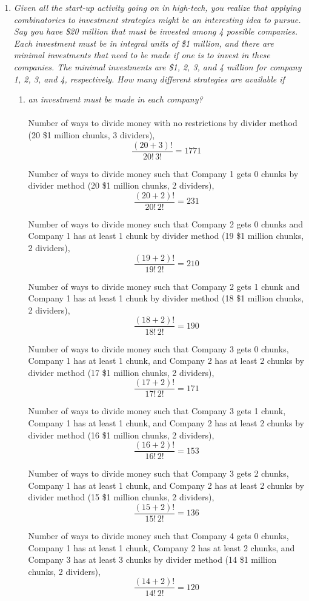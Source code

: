 \documentclass{article} %
\begin{document}
\begin{enumerate}
	\item \textit{Given all the start-up activity going on in high-tech, you realize that applying combinatorics to investment strategies might be an interesting idea to pursue. Say you have \$20 million that must be invested among 4 possible companies. Each investment must be in integral units of \$1 million, and there are minimal investments that need to be made if one is to invest in these companies. The minimal investments are \$1, 2, 3, and 4 million for company 1, 2, 3, and 4, respectively. How many different strategies are available if}
	\begin{enumerate}
		\item \textit{an investment must be made in each company?}\\
		\\
		Number of ways to divide money with no restrictions by divider method (20 \$1 million chunks, 3 dividers), $$\frac{(20 + 3)!}{20!\,3!} = 1771$$
		
		Number of ways to divide money such that Company 1 gets 0 chunks by divider method (20 \$1 million chunks, 2 dividers), $$\frac{(20 + 2)!}{20!\,2!} = 231$$
		
		Number of ways to divide money such that Company 2 gets 0 chunks and Company 1 has at least 1 chunk by divider method (19 \$1 million chunks, 2 dividers), $$\frac{(19 + 2)!}{19!\,2!} = 210$$
		
		Number of ways to divide money such that Company 2 gets 1 chunk and Company 1 has at least 1 chunk by divider method (18 \$1 million chunks, 2 dividers), $$\frac{(18 + 2)!}{18!\,2!} = 190$$
		
		Number of ways to divide money such that Company 3 gets 0 chunks, Company 1 has at least 1 chunk, and Company 2 has at least 2 chunks by divider method (17 \$1 million chunks, 2 dividers), $$\frac{(17 + 2)!}{17!\,2!} = 171$$
		
		Number of ways to divide money such that Company 3 gets 1 chunk, Company 1 has at least 1 chunk, and Company 2 has at least 2 chunks by divider method (16 \$1 million chunks, 2 dividers), $$\frac{(16 + 2)!}{16!\,2!} = 153$$
		
		Number of ways to divide money such that Company 3 gets 2 chunks, Company 1 has at least 1 chunk, and Company 2 has at least 2 chunks by divider method (15 \$1 million chunks, 2 dividers), $$\frac{(15 + 2)!}{15!\,2!} = 136$$
		
		Number of ways to divide money such that Company 4 gets 0 chunks, Company 1 has at least 1 chunk, Company 2 has at least 2 chunks, and Company 3 has at least 3 chunks by divider method (14 \$1 million chunks, 2 dividers), $$\frac{(14 + 2)!}{14!\,2!} = 120$$
		

\end{enumerate}
\end{enumerate}
\end{document}
